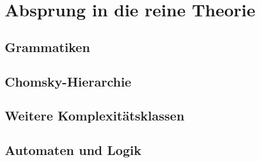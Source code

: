 \chapter{Absprung in die reine Theorie}\label{ch:theorie}
\section{Grammatiken}\label{grammatiken}
\section{Chomsky-Hierarchie}\label{chomsky}

\section{Weitere Komplexitätsklassen}
\section{Automaten und Logik}
